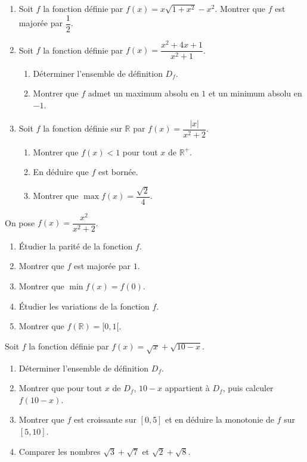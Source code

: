 \begin{enumerate}
\item Soit $f$ la fonction définie par $f(x)=x\sqrt{1+x^2}-x^2$. Montrer que $f$ est majorée par $\dfrac12$.
\item Soit $f$ la fonction définie par $f(x)=\dfrac{x^2+4x+1}{x^2+1}$.
\begin{enumerate}
\item Déterminer l'ensemble de définition $D_f$.
\item Montrer que $f$ admet un maximum absolu en $1$ et un minimum absolu en $-1$.
\end{enumerate}
\item Soit $f$ la fonction définie sur $\mathbb{R}$ par $f(x)=\dfrac{|x|}{x^2+2}$.
\begin{enumerate}
\item Montrer que $f(x)<1$ pour tout $x$ de $\mathbb{R}^+$.
\item En déduire que $f$ est bornée.
\item Montrer que $\max f(x)=\dfrac{\sqrt2}{4}$.
\end{enumerate}
\end{enumerate}
\fin
On pose $f(x)=\dfrac{x^2}{x^2+2}$.
\begin{enumerate}
\item Étudier la parité de la fonction $f$.
\item Montrer que $f$ est majorée par $1$.
\item Montrer que $\min f(x)=f(0)$.
\item Étudier les variations de la fonction $f$.
\item Montrer que $f(\mathbb{R})=[0,1[$.
\end{enumerate}
\fin
{}
Soit $f$ la fonction définie par $f(x)=\sqrt x+\sqrt{10-x}$.
\begin{enumerate}
\item Déterminer l'ensemble de définition $D_f$.
\item Montrer que pour tout $x$ de $D_f$, $10-x$ appartient à $D_f$, puis calculer $f(10-x)$.
\item Montrer que $f$ est croissante sur $[0,5]$ et en déduire la monotonie de $f$ sur $[5,10]$.
\item Comparer les nombres $\sqrt3+\sqrt7$ et $\sqrt2+\sqrt8$.
\end{enumerate}
\fin
